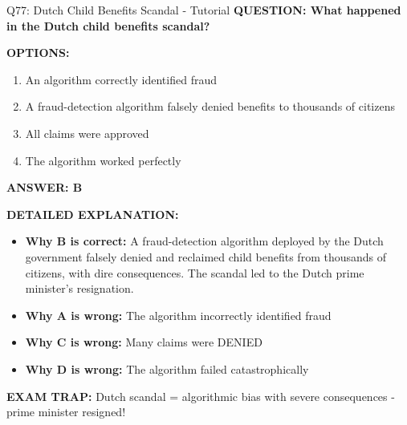 \documentclass[8pt]{beamer}
\begin{document}
	\begin{frame}{Q77: Dutch Child Benefits Scandal - Tutorial}
		\fontsize{6.5}{7.5}\selectfont
		\textbf{QUESTION: What happened in the Dutch child benefits scandal?}
		
		\vspace{0.1cm}
		\textbf{OPTIONS:}
		\begin{enumerate}
			\item An algorithm correctly identified fraud
			\item A fraud-detection algorithm falsely denied benefits to thousands of citizens
			\item All claims were approved
			\item The algorithm worked perfectly
		\end{enumerate}
		
		\vspace{0.1cm}
		\textcolor{myblue}{\textbf{ANSWER: B}}
		
		\vspace{0.1cm}
		\textbf{DETAILED EXPLANATION:}
		\begin{itemize}
			\item \textbf{Why B is correct:} A fraud-detection algorithm deployed by the Dutch government falsely denied and reclaimed child benefits from thousands of citizens, with dire consequences. The scandal led to the Dutch prime minister's resignation.
			\item \textbf{Why A is wrong:} The algorithm incorrectly identified fraud
			\item \textbf{Why C is wrong:} Many claims were DENIED
			\item \textbf{Why D is wrong:} The algorithm failed catastrophically
		\end{itemize}
		
		\textcolor{myred}{\textbf{EXAM TRAP:}} Dutch scandal = \textcolor{myblue}{algorithmic bias with severe consequences} - prime minister resigned!
	\end{frame}
	
\end{document}
